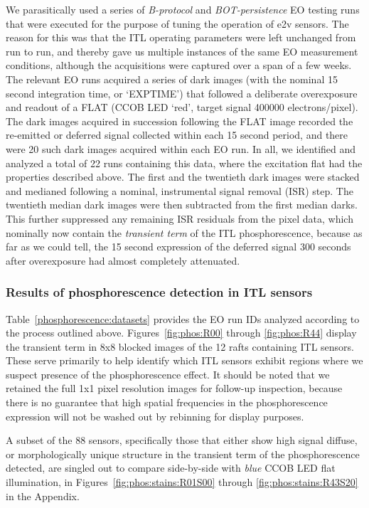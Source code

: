 We parasitically used a series of {\it B-protocol} and {\it BOT-persistence} EO testing runs that were executed for the purpose of tuning the operation of e2v sensors. The reason for this was that the ITL operating parameters were left unchanged from run to run, and thereby gave us multiple instances of the same EO measurement conditions, although the acquisitions were captured over a span of a few weeks. The relevant EO runs acquired a series of dark images (with the nominal 15 second integration time, or `EXPTIME') that followed a deliberate overexposure and readout of a FLAT (CCOB LED `red', target signal 400000 electrons/pixel). The dark images acquired in succession following the FLAT image recorded the re-emitted or deferred signal collected within each 15 second period, and there were 20 such dark images acquired within each EO run. In all, we identified and analyzed a total of 22 runs containing this data, where the excitation flat had the properties described above. The first and the twentieth dark images were stacked and medianed following a nominal, instrumental signal removal (ISR) step. The twentieth median dark images were then subtracted from the first median darks. This further suppressed any remaining ISR residuals from the pixel data, which nominally now contain the {\it transient term} of the ITL phosphorescence, because as far as we could tell, the 15 second expression of the deferred signal 300 seconds after overexposure had almost completely attenuated.

\subsubsection{Results of phosphorescence detection in ITL sensors}\label{phos-results}

Table~\ref{phosphorescence:datasets} provides the EO run IDs analyzed according to the process outlined above. Figures~\ref{fig:phos:R00} through \ref{fig:phos:R44} display the transient term in 8x8 blocked images of the 12 rafts containing ITL sensors. These serve primarily to help identify which ITL sensors exhibit regions where we suspect presence of the phosphorescence effect. It should be noted that we retained the full 1x1 pixel resolution images for follow-up inspection, because there is no guarantee that high spatial frequencies in the phosphorescence expression will not be washed out by rebinning for display purposes.

A subset of the 88 sensors, specifically those that either show high signal diffuse, or morphologically unique structure in the transient term of the phosphorescence detected, are singled out to compare side-by-side with {\it blue} CCOB LED flat illumination, in Figures~\ref{fig:phos:stains:R01S00} through \ref{fig:phos:stains:R43S20} in the Appendix. 


